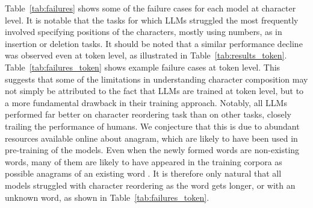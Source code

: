 \documentclass{article}
\theoremstyle{plain}
\theoremstyle{definition}
\theoremstyle{remark}
\begin{document}
Table~\ref{tab:failures} shows some of the failure cases for each model at character level. It is notable that the tasks for which LLMs struggled the most frequently involved specifying positions of the characters, mostly using numbers, as in insertion or deletion tasks. It should be noted that a similar performance decline was observed even at token level, as illustrated in Table~\ref{tab:results_token}. Table~\ref{tab:failures_token} shows example failure cases at token level. This suggests that some of the limitations in understanding character composition may not simply be attributed to the fact that LLMs are trained at token level, but to a more fundamental drawback in their training approach. Notably, all LLMs performed far better on character reordering task than on other tasks, closely trailing the performance of humans. We conjecture that this is due to abundant resources available online about anagram, which are likely to have been used in pre-training of the models. Even when the newly formed words are non-existing words, many of them are likely to have appeared in the training corpora as possible anagrams of an existing word . It is therefore only natural that all models struggled with character reordering as the word gets longer, or with an unknown word, as shown in Table~\ref{tab:failures_token}.


\begin{table}[t]
\caption{Example of LLMs' performances at token level in tasks that do not involve numerical elements. Bold letters indicate the correct answer by the model.}
    \label{tab:success_token}
    \centering
    \vspace{-7mm}
\end{table}
\end{document}
